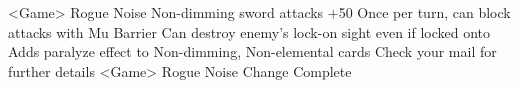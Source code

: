 <Game> Rogue Noise Non-dimming sword attacks +50 
Once per turn, can block attacks with Mu Barrier 
Can destroy enemy's lock-on sight even if locked onto 
Adds paralyze effect to Non-dimming, Non-elemental cards 
Check your mail for further details 
<Game> Rogue Noise Change Complete 
